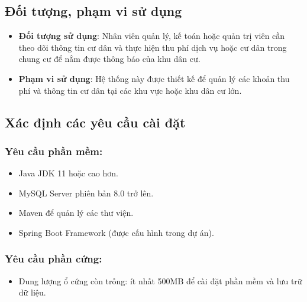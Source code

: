 \documentclass{article}
\begin{document}
\subsection{Đối tượng, phạm vi sử dụng}
\begin{itemize} 
    \item \textbf{Đối tượng sử dụng}: Nhân viên quản lý, kế toán hoặc quản trị viên cần theo dõi thông tin cư dân và thực hiện thu phí dịch vụ hoặc cư dân trong chung cư để nắm được thông báo của khu dân cư.
    \item \textbf{Phạm vi sử dụng}: Hệ thống này được thiết kế để quản lý các khoản thu phí và thông tin cư dân tại các khu vực hoặc khu dân cư lớn. 
\end{itemize}
\subsection{Xác định các yêu cầu cài đặt}
\subsubsection{\textbf{Yêu cầu phần mềm}:}
\begin{itemize}
    \item Java JDK 11 hoặc cao hơn.
    \item MySQL Server phiên bản 8.0 trở lên.
    \item Maven để quản lý các thư viện.
    \item Spring Boot Framework (được cấu hình trong dự án).
\end{itemize}
\subsubsection{\textbf{Yêu cầu phần cứng}:}
\begin{itemize}

    \item Dung lượng ổ cứng còn trống: ít nhất 500MB để cài đặt phần mềm và lưu trữ dữ liệu.
\end{itemize}
\end{document}
